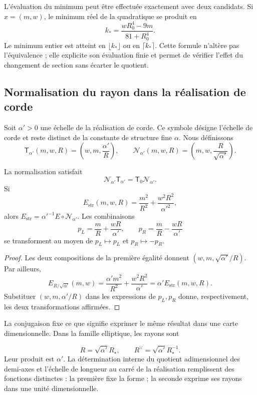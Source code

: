 L’évaluation du minimum peut être effectuée exactement avec deux
candidats. Si \(x=(m,w)\), le minimum réel de la quadratique
se produit en
\[
 k_* =\frac{wR_0^4-9m}{81+R_0^4}.
\]
Le minimum entier est atteint en \(\lfloor k_*\rfloor\) ou en
\(\lceil k_*\rceil\). Cette formule n’altère pas l’équivalence ;
elle explicite son évaluation finie et permet de vérifier l’effet
du changement de section sans écarter le quotient.

\subsection{Normalisation du rayon dans la réalisation de corde}

Soit \(\alpha'>0\) une échelle de la réalisation de corde.
Ce symbole désigne l’échelle de corde et reste distinct
de la constante de structure fine \(\alpha\). Nous définissons
\begin{equation}
 \mathsf T_{\alpha'}(m,w,R)
 =\left(w,m,\frac{\alpha'}R\right),\qquad
 \mathcal N_{\alpha'}(m,w,R)
 =\left(m,w,\frac R{\sqrt{\alpha'}}\right).
 \label{iv:iv:eq:normalizacion-cuerda}
\end{equation}

\begin{theorem}
\label{iv:iv:thm:normalizacion-cuerda}
La normalisation satisfait
\[
 \mathcal N_{\alpha'}\mathsf T_{\alpha'}
 =\mathsf T_0\mathcal N_{\alpha'}.
\]
Si
\[
 E_{\mathrm{str}}(m,w,R)
 =\frac{m^2}{R^2}+\frac{w^2R^2}{\alpha'^2},
\]
alors
\(E_{\mathrm{str}}=\alpha'^{-1}E\circ\mathcal N_{\alpha'}\).
Les combinaisons
\[
 p_L=\frac mR+\frac{wR}{\alpha'},\qquad
 p_R=\frac mR-\frac{wR}{\alpha'}
\]
se transforment au moyen de \(p_L\mapsto p_L\) et \(p_R\mapsto-p_R\).
\end{theorem}
\begin{proof}
Les deux compositions de la première égalité donnent
\((w,m,\sqrt{\alpha'}/R)\). Par ailleurs,
\[
 E_{R/\sqrt{\alpha'}}(m,w)
 =\frac{\alpha'm^2}{R^2}+\frac{w^2R^2}{\alpha'}
 =\alpha'E_{\mathrm{str}}(m,w,R).
\]
Substituer \((w,m,\alpha'/R)\) dans les expressions de
\(p_L,p_R\) donne, respectivement, les deux transformations
affirmées.
\end{proof}

La conjugaison fixe ce que signifie exprimer le même résultat dans
une carte dimensionnelle. Dans la famille elliptique, les rayons sont

\[
 R=\sqrt{\alpha'}R_\star,\qquad
 R^\vee=\sqrt{\alpha'}R_\star^{-1}.
\]
Leur produit est \(\alpha'\). La détermination interne du quotient
adimensionnel des demi-axes et l’échelle de longueur au carré de la
réalisation remplissent des fonctions distinctes : la première fixe la forme ;
la seconde exprime ses rayons dans une unité dimensionnelle.

